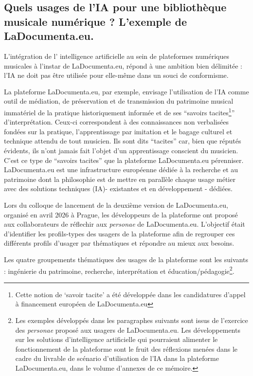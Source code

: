 \subsection*{Quels usages de l'IA pour une bibliothèque musicale numérique ? L'exemple de LaDocumenta.eu.}

L'intégration de l' intelligence artificielle au sein de plateformes numériques musicales à l'instar de LaDocumenta.eu, répond à une ambition bien délimitée : l'IA ne doit pas être utilisée pour elle-même dans un souci de conformisme. 

La plateforme LaDocumenta.eu, par exemple, envisage l'utilisation de l'IA comme outil de médiation, de préservation et de transmission du patrimoine musical immatériel de la pratique historiquement informée et de ses \enquote{savoirs tacites\footnote{Cette notion de \enquote{savoir tacite} a été développée dans les candidatures d'appel à financement européen de LaDocumenta.eu}} d'interprétation. Ceux-ci correspondent à des connaissances non verbalisées fondées sur la pratique, l'apprentissage par imitation et le bagage culturel et technique attendu de tout musicien. Ils sont dits \enquote{tacites} car, bien que réputés évidents, ils n'ont jamais fait l'objet d'un apprentissage conscient du musicien. C'est ce type de \enquote{savoirs tacites} que la plateforme LaDocumenta.eu pérenniser.
LaDocumenta.eu est une infrastructure européenne dédiée à la recherche et au patrimoine dont la philosophie est de mettre en parallèle chaque usage métier avec des solutions techniques (IA)- existantes et en développement - dédiées.

Lors du colloque de lancement de la deuxième version de LaDocumenta.eu, organisé en avril 2026 à Prague, les développeurs de la plateforme ont proposé aux collaborateurs de réflechir aux \textit{personae} de LaDocumenta.eu. L'objectif était d'identifier les profils-types des usagers de la plateforme afin de regrouper ces différents profils d'usager par thématiques et répondre au mieux aux besoins. 



Les quatre groupements thématiques des usages de la plateforme sont les suivants : ingénierie du patrimoine, recherche, interprétation et éducation/pédagogie\footnote{Les exemples développés dans les paragraphes suivants sont issus de l'exercice des \textit{personae} proposé aux usagers de LaDocumenta.eu. Les développements sur les solutions d'intelligence artificielle qui pourraient alimenter le fonctionnement de la plateforme sont le fruit des réflexions menées dans le cadre du livrable de scénario d'utilisation de l'IA dans la plateforme LaDocumenta.eu, dans le volume d'annexes de ce mémoire.}. 



